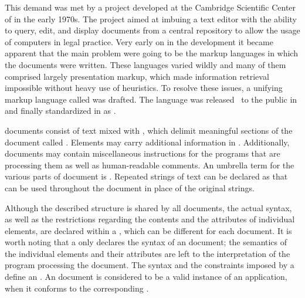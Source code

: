 This demand was met by a project developed at the Cambridge Scientific Center of  in the early 1970s. The
project aimed at imbuing a text editor with the ability to query, edit, and
display documents from a central repository to allow the usage of computers in
legal practice. Very early on in the development it became apparent that the
main problem were going to be the markup languages in which the documents were
written. These languages varied wildly and many of them comprised largely
presentation markup, which made information retrieval impossible without heavy
use of heuristics. To resolve these issues, a unifying markup language called
 was drafted. The language was released~\cite{goldfarb81} to the
public in \citeyear{goldfarb81} and finally standardized in \citeyear{iso86} as
.~\cite{iso86}

 documents consist of text mixed with %
, which delimit meaningful sections of the document called
. Elements may carry additional
information in . Additionally,
 documents may contain miscellaneous instructions for the programs
that are processing them as well as human-readable comments. An umbrella term for
the various parts of  document is
. Repeated strings of text can be declared
as   that can be used
throughout the document in place of the original strings. 

Although the described structure is shared by all  documents, the
actual syntax, as well as the restrictions regarding the contents and the
attributes of individual elements, are declared within a , which
can be different for each document. It is worth noting that a  only
declares the syntax of an  document; the semantics of the
individual elements and their attributes are left to the interpretation of the
program processing the document. The syntax and the constraints imposed by a
 define an %
. An  document is considered to be a
valid instance of an  application, when it conforms to the
corresponding .

